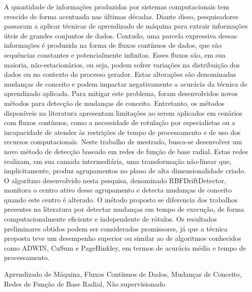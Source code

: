 \documentclass[qual, classic, a4paper]{ufbathesis}
\begin{document}
A quantidade de informações produzidas por sistemas computacionais tem crescido de forma acentuada nas últimas décadas.
Diante disso, pesquisadores passaram a aplicar técnicas de aprendizado de máquina para extrair informações úteis de grandes conjuntos de dados.
Contudo, uma parcela expressiva dessas informações é produzida na forma de fluxos contínuos de dados, que são sequências constantes e potencialmente infinitas.
Esses fluxos são, em sua maioria, não-estacionários, ou seja, podem sofrer variações na distribuição dos dados ou no contexto do processo gerador.
Estas alterações são denominadas mudanças de conceito e podem impactar negativamente a acurácia da técnica de aprendizado aplicada.
Para mitigar este problema, foram desenvolvidos novos métodos para detecção de mudanças de conceito.
Entretanto, os métodos disponíveis na literatura apresentam limitações ao serem aplicados em cenários com fluxos contínuos, como a necessidade de rotulação por especialistas ou a incapacidade de atender às restrições de tempo de processamento e de uso dos recursos computacionais.
Neste trabalho de mestrado, busca-se desenvolver um novo método de detecção baseado em redes de função de base radial.
Estas redes realizam, em sua camada intermediária, uma transformação não-linear que, implicitamente, produz agrupamentos no plano de alta dimensionalidade criado.
O algoritmo desenvolvido nesta pesquisa, denominado RBFDriftDetector, monitora o centro ativo desse agrupamento e detecta mudanças de conceito quando este centro é alterado.
O método proposto se diferencia dos trabalhos presentes na literatura por detectar mudanças em tempo de execução, de forma computacionalmente eficiente e independente de rótulos.
Os resultados preliminares obtidos podem ser considerados promissores, 
já que a técnica proposta teve um desempenho superior ou similar ao de algoritmos conhecidos como ADWIN, CuSum e PageHinkley, em termos de acurácia média e tempo de processamento.

\begin{keywords}
    Aprendizado de Máquina, Fluxos Contínuos de Dados, Mudanças de Conceito, Redes de Função de Base Radial, Não supervisionado
\end{keywords}


\end{document}
